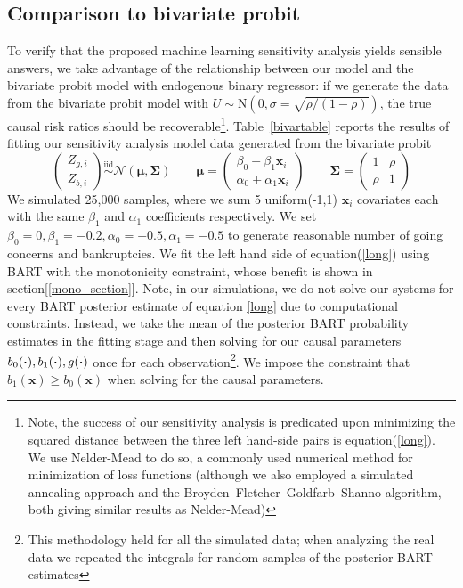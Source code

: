\documentclass[aoas,preprint, 11pt, dvipsnames, table, x11name]{imsart}
\renewcommand{\bm}[1]{\mathbf{#1}}
\theoremstyle{remark}
\begin{document}
	\subsection{Comparison to bivariate probit}\label{bivar_simsec} To verify that the proposed machine learning sensitivity analysis yields sensible answers, we take advantage of the relationship between our model and the bivariate probit model with endogenous binary regressor: if we generate the data from the bivariate probit model with $U \sim \mbox{N}(0, \sigma=\sqrt{\rho/(1-\rho)})$, the true causal risk ratios should be recoverable\footnote{Note, the success of our sensitivity analysis is predicated upon  minimizing the squared distance between the three left hand-side pairs is equation(\ref{long}). We use Nelder-Mead to do so, a commonly used numerical method for minimization of loss functions \citep{nelder} (although we also employed a simulated annealing approach and the Broyden–Fletcher–Goldfarb–Shanno algorithm, both giving similar results as Nelder-Mead)}.  Table~\ref{bivartable} reports the results of fitting our sensitivity analysis model data generated from the bivariate probit
	\[
	\begin{pmatrix}
		Z_{g,i}\\
		Z_{b,i}
	\end{pmatrix}\stackrel{\text{iid}}{\sim}\mathcal{N}(\bm{\mu}, \bm{\Sigma})
	\qquad \bm{\mu}=\begin{pmatrix}
		\beta_0+\beta_1\bm{x}_i\\
		\alpha_0+\alpha_1\bm{x}_i
	\end{pmatrix}
	\qquad
	\bm{\Sigma}=\begin{pmatrix}
		1&\rho\\
		\rho&1
	\end{pmatrix}
	\label{model3}
	\]
	We simulated 25,000 samples, where we sum 5 uniform(-1,1) $\bm{x}_i$ covariates each with the same $\beta_1$ and $\alpha_1$ coefficients respectively.  We set $\beta_0=0, \beta_1=-0.2, \alpha_0=-0.5, \alpha_1=-0.5$ to generate reasonable number of going concerns and bankruptcies.  We fit the left hand side of equation(\ref{long}) using BART with the monotonicity constraint, whose benefit is shown in section[\ref{mono_section}].  Note, in our simulations, we do not solve our systems for every BART posterior estimate of equation \ref{long} due to computational constraints.  Instead, we take the mean of the posterior BART probability estimates in the fitting stage and then solving for our causal parameters $b_0(\vdot), b_1(\vdot), g(\vdot)$ once for each observation\footnote{This methodology held for all the simulated data; when analyzing the real data we repeated the integrals for random samples of the posterior BART estimates}.  We impose the constraint that $b_1(\bm{x})\geq b_0(\bm{x})$ when solving for the causal parameters.
	
\end{document}

